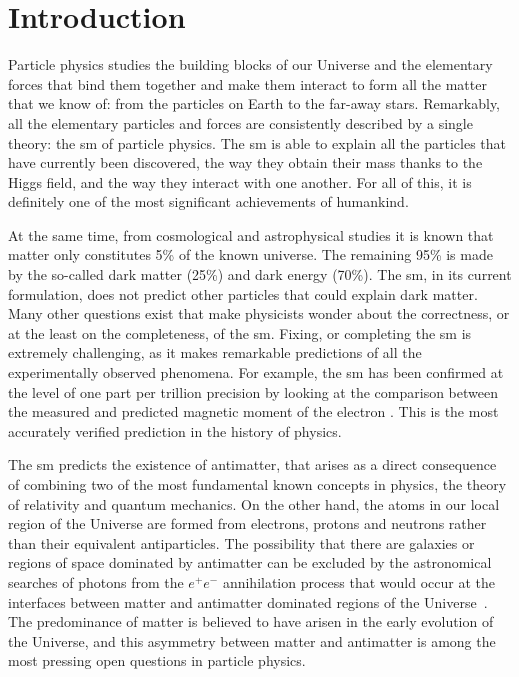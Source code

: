\chapter{Introduction}
\label{ch:introduction}





Particle physics studies the building blocks of our Universe and the elementary forces that bind them together and make them interact to form all the matter that we know of: from the particles on Earth to the far-away stars. Remarkably, all the elementary particles and forces are consistently described by a single theory: the \acrfull{sm} of particle physics. The \acrshort{sm} is able to explain all the particles that have currently been discovered, the way they obtain their mass thanks to the Higgs field, and the way they interact with one another. For all of this, it is definitely one of the most significant achievements of humankind. 

At the same time, from cosmological and astrophysical studies it is known that matter only constitutes 5\% of the known universe. The remaining 95\% is made by the so-called dark matter (25\%) and dark energy (70\%). The \acrshort{sm}, in its current formulation, does not predict other particles that could explain dark matter.
Many other questions exist that make physicists wonder about the correctness, or at the least on the completeness, of the \acrshort{sm}.
Fixing, or completing the \acrshort{sm} is extremely challenging, as it makes remarkable predictions of all the experimentally observed phenomena. For example, the \acrshort{sm} has been confirmed at the level of one part per trillion precision by looking at the comparison between the measured and predicted magnetic moment of the electron \cite{electron_magnetic_moment}. This is the most accurately verified prediction in the history of physics. 

The \acrshort{sm} predicts the existence of antimatter, that arises as a direct consequence of combining two of the most fundamental known concepts in physics, the theory of relativity and quantum mechanics. On the other hand, the atoms in our local region of the Universe are formed from electrons, protons and neutrons rather than their equivalent antiparticles. The possibility that there are galaxies or regions of space dominated by antimatter can be excluded by the astronomical searches of photons from the $e^{+}e^{-}$ annihilation process that would occur at the interfaces between matter and antimatter dominated regions of the Universe~\cite{antimatter}. The predominance of matter is believed to have arisen in the early evolution of the Universe, and this asymmetry between matter and antimatter is among the most pressing open questions in particle physics.

